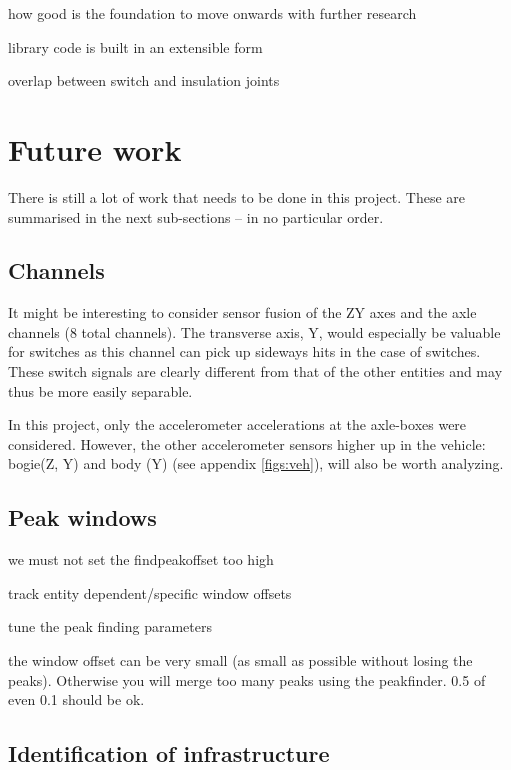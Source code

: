 how good is the foundation to move onwards with further research

library code is built in an extensible form

overlap between switch and insulation joints


\section{Future work}
There is still a lot of work that needs to be done in this project. These are summarised in the next sub-sections -- in no particular order. 

\subsection{Channels}
It might be interesting to consider sensor fusion of the ZY axes and the axle channels (8 total channels). The transverse axis, Y, would especially be valuable for switches as this channel can pick up sideways hits in the case of switches. These switch signals are clearly different from that of the other entities and may thus be more easily separable.
	
In this project, only the accelerometer accelerations at the axle-boxes were considered. However, the other accelerometer sensors higher up in the vehicle: bogie(Z, Y) and body (Y) (see appendix \ref{figs:veh}), will also be worth analyzing.

\subsection{Peak windows}
we must not set the findpeakoffset too high

track entity dependent/specific window offsets

tune the peak finding parameters

the window offset can be very small (as small as possible without losing the peaks). Otherwise you will merge too many peaks using the peakfinder. 0.5 of even 0.1 should be ok. 

\subsection{Identification of infrastructure}
	
